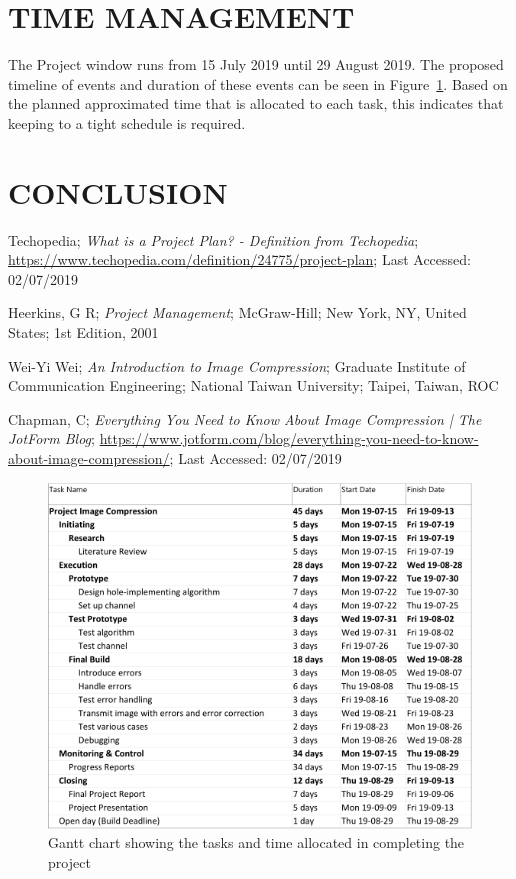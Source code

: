 \documentclass[10pt,twocolumn]{witseiepaper}
\begin{document}
%
\section{TIME MANAGEMENT}
\label{sec: Time Management}
The Project window runs from 15 July 2019 until 29 August 2019. The proposed timeline of events and duration of these events can be seen in Figure~\ref{fig: Gantt}. Based on the planned approximated time that is allocated to each task, this indicates that keeping to a tight schedule is required.


%
\section{CONCLUSION}
\label{sec: Conclusion}


%
\begin{thebibliography}{}


Techopedia; \emph{What is a Project Plan? - Definition from Techopedia}; \url{https://www.techopedia.com/definition/24775/project-plan}; Last Accessed: 02/07/2019

Heerkins, G R; \emph{Project Management}; McGraw-Hill; New York, NY, United States; 1st Edition, 2001

Wei-Yi Wei; \emph{An Introduction to Image Compression}; Graduate Institute of Communication Engineering; National Taiwan University; Taipei, Taiwan, ROC

Chapman, C; \emph{Everything You Need to Know About Image Compression | The JotForm Blog}; \url{https://www.jotform.com/blog/everything-you-need-to-know-about-image-compression/}; Last Accessed: 02/07/2019

\end{thebibliography}

\onecolumn
\begin{figure}[h!]
\renewcommand{\thefigure}{\arabic{figure}}
\centering
\includegraphics[scale=1]{Gantt.png}
\caption{Gantt chart showing the tasks and time allocated in completing the project}
\label{fig: Gantt}
\end{figure}
\end{document}
